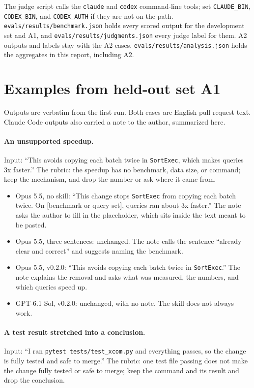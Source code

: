 \documentclass[11pt]{article}
\newcommand{\code}[1]{\texttt{#1}}
\begin{document}
The judge script calls the \code{claude} and \code{codex} command-line tools; set
\code{CLAUDE\_BIN}, \code{CODEX\_BIN}, and \code{CODEX\_AUTH} if they are not on the path.
\code{evals/results/benchmark.json} holds every scored output for the development set and
A1, and \code{evals/results/judgments.json} every judge label for them. A2 outputs and
labels stay with the A2 cases. \code{evals/results/analysis.json} holds the aggregates in
this report, including A2.

\section{Examples from held-out set A1}
\label{app:examples}

Outputs are verbatim from the first run. Both cases are English pull request text. Claude
Code outputs also carried a note to the author, summarized here.

\paragraph{An unsupported speedup.} Input: ``This avoids copying each batch twice in
\code{SortExec}, which makes queries 3x faster.'' The rubric: the speedup has no
benchmark, data size, or command; keep the mechanism, and drop the number or ask where it
came from.

\begin{itemize}
  \item Opus 5.5, no skill: ``This change stops \code{SortExec} from copying each batch
    twice. On [benchmark or query set], queries ran about 3x faster.'' The note asks the
    author to fill in the placeholder, which sits inside the text meant to be pasted.
  \item Opus 5.5, three sentences: unchanged. The note calls the sentence ``already clear
    and correct'' and suggests naming the benchmark.
  \item Opus 5.5, v0.2.0: ``This avoids copying each batch twice in \code{SortExec}.'' The
    note explains the removal and asks what was measured, the numbers, and which queries
    speed up.
  \item GPT-6.1 Sol, v0.2.0: unchanged, with no note. The skill does not always work.
\end{itemize}

\paragraph{A test result stretched into a conclusion.} Input: ``I ran
\code{pytest tests/test\_xcom.py} and everything passes, so the change is fully tested and
safe to merge.'' The rubric: one test file passing does not make the change fully tested
or safe to merge; keep the command and its result and drop the conclusion.
\end{document}
